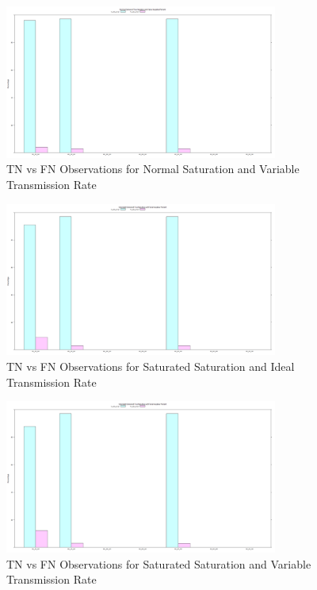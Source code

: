 	\begin{figure}[H]
	\centering
	\includegraphics[width=0.8\textwidth]{Chap7/figures/plots/normal_variable/tnvsfn_percent.png}
	\caption{TN vs FN Observations for Normal Saturation and Variable Transmission Rate}
	\label{fig:sim:res:norm:variable:tnfn}
	\end{figure}

	\begin{figure}[H]
	\centering
	\includegraphics[width=0.8\textwidth]{Chap7/figures/plots/saturated_ideal/tnvsfn_percent.png}
	\caption{TN vs FN Observations for Saturated Saturation and Ideal Transmission Rate}
	\label{fig:sim:res:sat:ideal:tnfn}
	\end{figure}

	\begin{figure}[H]
	\centering
	\includegraphics[width=0.8\textwidth]{Chap7/figures/plots/saturated_variable/tnvsfn_percent.png}
	\caption{TN vs FN Observations for Saturated Saturation and Variable Transmission Rate}
	\label{fig:sim:res:sat:variable:tnfn}
	\end{figure}

